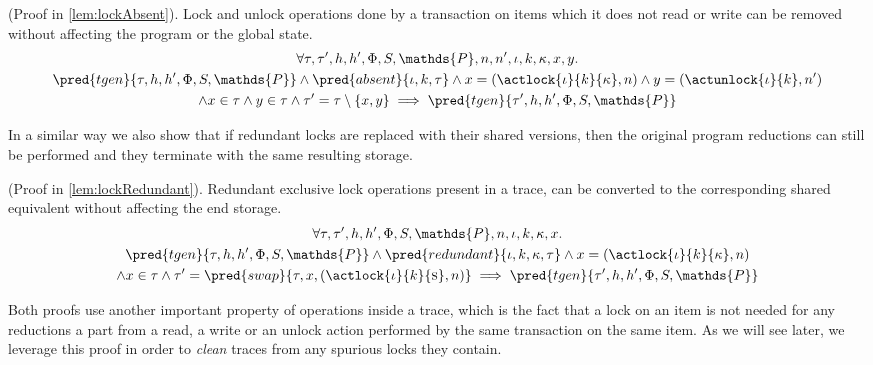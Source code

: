 \begin{lem}
	(Proof in \ref{lem:lockAbsent}).
	Lock and unlock operations done by a transaction on items which it does not read or write can be removed without affecting the program or the global state.
	\begin{gather*}
		\forall \tau, \tau', h, h', \Phi, S, \mathds{P}, n, n', \iota, k, \kappa, x, y \ldotp
			\\
		\pred{tgen}{\tau, h, h', \Phi, S, \mathds{P}} \land \pred{absent}{\iota, k, \tau} \land x = (\actlock{\iota}{k}{\kappa}, n) \land y = (\actunlock{\iota}{k}, n') \\ \land x \in \tau \land y \in \tau
		\land \tau' = \tau \setminus \{ x, y \}
			\implies
		\pred{tgen}{\tau', h, h', \Phi, S, \mathds{P}}
	\end{gather*}
\end{lem}

In a similar way we also show that if redundant locks are replaced with their shared versions, then the original program reductions can still be performed and they terminate with the same resulting storage.
\begin{lem}
	(Proof in \ref{lem:lockRedundant}).
	Redundant exclusive lock operations present in a trace, can be converted to the corresponding shared equivalent without affecting the end storage.
	\begin{gather*}
		\forall \tau, \tau', h, h', \Phi, S, \mathds{P}, n, \iota, k, \kappa, x \ldotp
			\\
		\pred{tgen}{\tau, h, h', \Phi, S, \mathds{P}} \land \pred{redundant}{\iota, k, \kappa, \tau} \land x = (\actlock{\iota}{k}{\kappa}, n)
		\\ \land x \in \tau
		\land \tau' = \pred{swap}{\tau, x, (\actlock{\iota}{k}{\textsc{s}}, n)}
			\implies
		\pred{tgen}{\tau', h, h', \Phi, S, \mathds{P}}
	\end{gather*}
\end{lem}

Both proofs use another important property of operations inside a trace, which is the fact that a lock on an item is not needed for any reductions a part from a read, a write or an unlock action performed by the same transaction on the same item. As we will see later, we leverage this proof in order to \textit{clean} traces from any spurious locks they contain.

